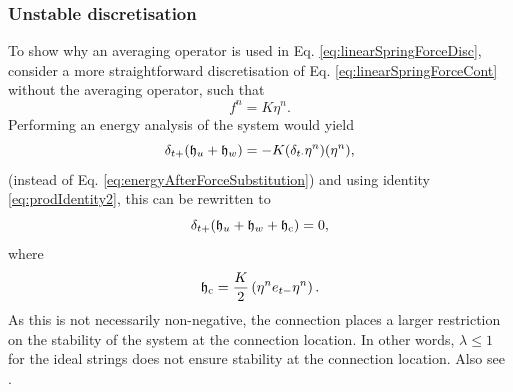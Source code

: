 \subsubsection{Unstable discretisation}
To show why an averaging operator is used in Eq. \eqref{eq:linearSpringForceDisc}, consider a more straightforward discretisation of Eq. \eqref{eq:linearSpringForceCont} without the averaging operator, such that
\begin{equation*}
    f^n = K\eta^n.
\end{equation*}
Performing an energy analysis of the system would yield 
\begin{equation*}
    \delta_{t+} (\mathfrak{h}_u + \mathfrak{h}_w) = -K(\delta_{t\cdot} \eta^n) (\eta^n),
\end{equation*}
(instead of Eq. \eqref{eq:energyAfterForceSubstitution}) and using identity \eqref{eq:prodIdentity2}, this can be rewritten to
\begin{equation*}
    \delta_{t+} (\mathfrak{h}_u + \mathfrak{h}_w + \mathfrak{h}_{\text{c}}) = 0,
\end{equation*}
where
\begin{equation*}
    \mathfrak{h}_{\text{c}} = \frac{K}{2}\left(\eta^ne_{t-}\eta^n\right).
\end{equation*}
As this is not necessarily non-negative, the connection places a larger restriction on the stability of the system at the connection location. In other words, $\lambda \leq 1$ for the ideal strings does not ensure stability at the connection location. Also see \cite[pp. 190--192]{theBible}.




